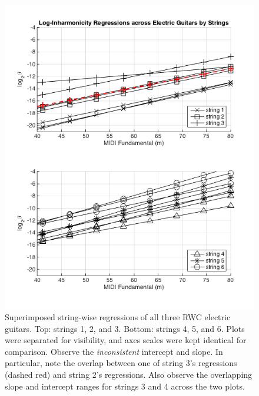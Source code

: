 \documentclass[12pt]{cmuthesis}
\begin{document}
\begin{figure}[!htbp] 
\centering
\includegraphics[scale=0.75]{traj-compare-eg}
\caption{Superimposed string-wise regressions of all three RWC electric guitars. Top: strings 1, 2, and 3. Bottom: strings 4, 5, and 6. Plots were separated for visibility, and axes scales were kept identical for comparison. Observe the \textit{inconsistent} intercept and slope. In particular, note the overlap between one of string 3's regressions (dashed red) and string 2's regressions. Also observe the overlapping slope and intercept ranges for strings 3 and 4 across the two plots.}
\label{fig:eg-traj-comp}
\end{figure}
\end{document}
